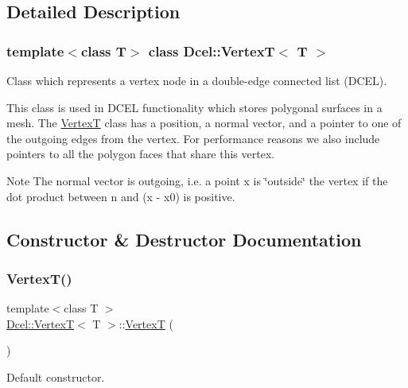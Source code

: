 \subsection{Detailed Description}
\subsubsection*{template$<$class T$>$\newline
class Dcel\+::\+Vertex\+T$<$ T $>$}

Class which represents a vertex node in a double-\/edge connected list (D\+C\+EL). 

This class is used in D\+C\+EL functionality which stores polygonal surfaces in a mesh. The \hyperlink{classDcel_1_1VertexT}{VertexT} class has a position, a normal vector, and a pointer to one of the outgoing edges from the vertex. For performance reasons we also include pointers to all the polygon faces that share this vertex. \begin{DoxyNote}{Note}
The normal vector is outgoing, i.\+e. a point x is \char`\"{}outside\char`\"{} the vertex if the dot product between n and (x -\/ x0) is positive. 
\end{DoxyNote}


\subsection{Constructor \& Destructor Documentation}
\mbox{\label{classDcel_1_1VertexT_ab93f0a7a59fa9d78d89d1b0e97451ce7}} 
\subsubsection{\texorpdfstring{Vertex\+T()}{VertexT()}\hspace{0.1cm}{\footnotesize\ttfamily [1/4]}}
{\footnotesize\ttfamily template$<$class T $>$ \\
\hyperlink{classDcel_1_1VertexT}{Dcel\+::\+VertexT}$<$ T $>$\+::\hyperlink{classDcel_1_1VertexT}{VertexT} (\begin{DoxyParamCaption}{ }\end{DoxyParamCaption})\hspace{0.3cm}{\ttfamily [inline]}}



Default constructor. 

